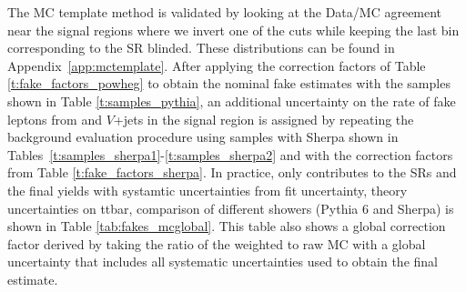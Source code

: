 The MC template method is validated by looking at the Data/MC agreement near the signal regions where we invert one of the cuts while keeping the last bin corresponding to the SR blinded. These distributions can be found in Appendix~\ref{app:mctemplate}.
After applying the correction factors of Table \ref{t:fake_factors_powheg} to obtain the nominal fake estimates with the samples shown 
in Table \ref{t:samples_pythia}, 
an additional uncertainty on the rate of fake leptons from \ttbar and $V$+jets in the signal region is assigned by repeating the background
 evaluation procedure using samples with Sherpa shown in Tables~\ref{t:samples_sherpa1}-\ref{t:samples_sherpa2} and with the correction 
factors from Table \ref{t:fake_factors_sherpa}. 
In practice, only \ttbar contributes to the SRs and the final yields with systamtic uncertainties from 
fit uncertainty, theory uncertainties on ttbar, comparison of different showers (Pythia 6 and Sherpa) is shown in Table \ref{tab:fakes_mcglobal}.
This table also shows a global correction factor derived by taking the ratio of the weighted \ttbar to raw MC \ttbar with
a global uncertainty that includes all systematic uncertainties used to obtain the final estimate. 


